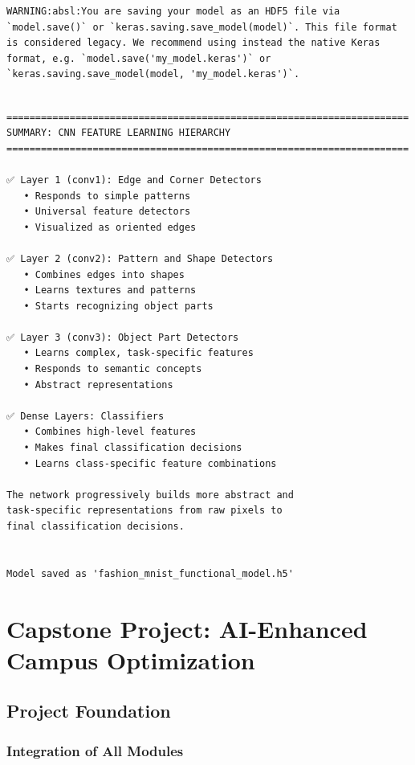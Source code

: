 \documentclass[
  letterpaper,
  DIV=11,
  numbers=noendperiod]{scrreprt}
\begin{document}
\begin{verbatim}
WARNING:absl:You are saving your model as an HDF5 file via `model.save()` or `keras.saving.save_model(model)`. This file format is considered legacy. We recommend using instead the native Keras format, e.g. `model.save('my_model.keras')` or `keras.saving.save_model(model, 'my_model.keras')`. 
\end{verbatim}

\begin{verbatim}

======================================================================
SUMMARY: CNN FEATURE LEARNING HIERARCHY
======================================================================

✅ Layer 1 (conv1): Edge and Corner Detectors
   • Responds to simple patterns
   • Universal feature detectors
   • Visualized as oriented edges

✅ Layer 2 (conv2): Pattern and Shape Detectors
   • Combines edges into shapes
   • Learns textures and patterns
   • Starts recognizing object parts

✅ Layer 3 (conv3): Object Part Detectors
   • Learns complex, task-specific features
   • Responds to semantic concepts
   • Abstract representations

✅ Dense Layers: Classifiers
   • Combines high-level features
   • Makes final classification decisions
   • Learns class-specific feature combinations

The network progressively builds more abstract and 
task-specific representations from raw pixels to 
final classification decisions.


Model saved as 'fashion_mnist_functional_model.h5'
\end{verbatim}

\section{Capstone Project: AI-Enhanced Campus
Optimization}\label{capstone-project-ai-enhanced-campus-optimization}

\subsection{Project Foundation}\label{project-foundation}

\subsubsection{Integration of All
Modules}\label{integration-of-all-modules}
\end{document}
